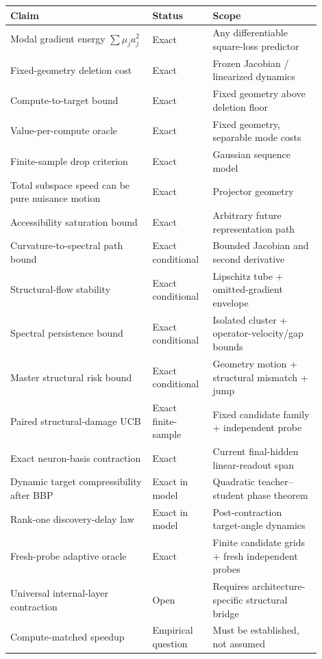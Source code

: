 \begin{center}
\begin{tabular}{p{0.42\linewidth}p{0.16\linewidth}p{0.32\linewidth}}
\toprule
Claim & Status & Scope \\
\midrule
Modal gradient energy $\sum\mu_ja_j^2$ & Exact & Any differentiable square-loss predictor \\
Fixed-geometry deletion cost & Exact & Frozen Jacobian / linearized dynamics \\
Compute-to-target bound & Exact & Fixed geometry above deletion floor \\
Value-per-compute oracle & Exact & Fixed geometry, separable mode costs \\
Finite-sample drop criterion & Exact & Gaussian sequence model \\
Total subspace speed can be pure nuisance motion & Exact & Projector geometry \\
Accessibility saturation bound & Exact & Arbitrary future representation path \\
Curvature-to-spectral path bound & Exact conditional & Bounded Jacobian and second derivative \\
Structural-flow stability & Exact conditional & Lipschitz tube + omitted-gradient envelope \\
Spectral persistence bound & Exact conditional & Isolated cluster + operator-velocity/gap bounds \\
Master structural risk bound & Exact conditional & Geometry motion + structural mismatch + jump \\
Paired structural-damage UCB & Exact finite-sample & Fixed candidate family + independent probe \\
Exact neuron-basis contraction & Exact & Current final-hidden linear-readout span \\
Dynamic target compressibility after BBP & Exact in model & Quadratic teacher--student phase theorem \\
Rank-one discovery-delay law & Exact in model & Post-contraction target-angle dynamics \\
Fresh-probe adaptive oracle & Exact & Finite candidate grids + fresh independent probes \\
Universal internal-layer contraction & Open & Requires architecture-specific structural bridge \\
Compute-matched speedup & Empirical question & Must be established, not assumed \\
\bottomrule
\end{tabular}
\end{center}

